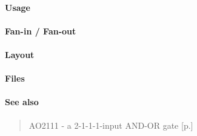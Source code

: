 \paragraph{Usage}

\paragraph{Fan-in / Fan-out}

\paragraph{Layout}

\paragraph{Files}

\paragraph{See also}
\begin{quote}
    AO2111 - a 2-1-1-1-input AND-OR gate [p.\pageref{AO2111}]
\end{quote}
